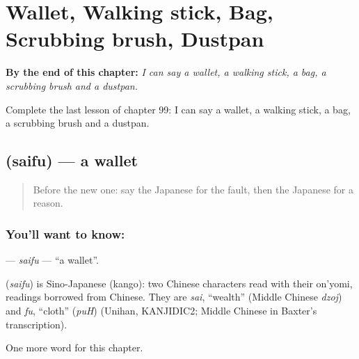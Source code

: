 
\chapter{Wallet, Walking stick, Bag, Scrubbing brush, Dustpan}
\label{ch:ja-wallet-walking-stick-bag-scrubbing-brush-dustpan}

\begin{chapteropening}
\textbf{By the end of this chapter:} \emph{I can say a wallet, a walking stick, a bag, a scrubbing brush and a dustpan.}

Complete the last lesson of chapter 99: I can say a wallet, a walking stick, a bag, a scrubbing brush and a dustpan.
\end{chapteropening}

\section[\texorpdfstring{\ja{さいふ} (saifu)}{さいふ (saifu)}]{ (saifu) — a wallet}

\label{lesson:JA-C99-saifu}



\begin{quote}
Before the new one: say the Japanese for the fault, then the Japanese for a reason.
\end{quote}

\subsection*{You'll want to know: }
\textbf{} — \emph{saifu} — \textquotedblleft{}a wallet\textquotedblright{}.

\begin{cousinweb}
\textbf{} (\emph{saifu}) is Sino-Japanese (kango): two Chinese characters read with their on'yomi, readings borrowed from Chinese. They are \emph{sai}, \textquotedblleft{}wealth\textquotedblright{} (Middle Chinese \emph{dzoj}) and \emph{fu}, \textquotedblleft{}cloth\textquotedblright{} (\emph{puH}) (Unihan, KANJIDIC2; Middle Chinese in Baxter's transcription).
\end{cousinweb}

\begin{grammarlens}[title={What you've built}]
One more word for this chapter.
\end{grammarlens}

